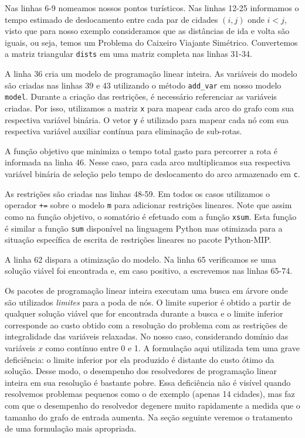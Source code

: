 \documentclass[a4paper,11pt,fleqn]{article}
\begin{document}
Nas linhas 6-9 nomeamos nossos pontos turísticos. 
Nas linhas 12-25 informamos o tempo estimado de deslocamento entre cada par de cidades $(i, j)$ onde $i<j$, visto que para nosso exemplo consideramos que as distâncias de ida e volta são iguais, ou seja, temos um Problema do Caixeiro Viajante Simétrico. 
Convertemos a matriz triangular \texttt{dists} em uma matriz completa nas linhas 31-34.

A linha 36 cria um modelo de programação linear inteira. 
As variáveis do modelo são criadas nas linhas 39 e 43 utilizando o método \texttt{add\_var} em nosso modelo \texttt{model}. 
Durante a criação das restrições, é necessário referenciar as variáveis criadas. 
Por isso, utilizamos a matriz \texttt{x} para mapear cada arco do grafo com sua respectiva variável binária.
O vetor \texttt{y} é utilizado para mapear cada nó com sua respectiva variável auxiliar contínua para eliminação de sub-rotas.

A função objetivo que minimiza o tempo total gasto para percorrer a rota é informada na linha 46. 
Nesse caso, para cada arco multiplicamos sua respectiva variável binária de seleção pelo tempo de deslocamento do arco armazenado em \texttt{c}.

As restrições são criadas nas linhas 48-59. Em todos os casos utilizamos o operador \texttt{+=} sobre o modelo \texttt{m} para adicionar restrições lineares. Note que assim como na função objetivo, o somatório é efetuado com a função \texttt{xsum}. Esta função é similar a função \texttt{sum} disponível na linguagem Python mas otimizada para a situação específica de escrita de restrições lineares no pacote Python-MIP\@. 

A linha 62 dispara a otimização do modelo. Na linha 65 verificamos se uma solução viável foi encontrada e, em caso positivo, a escrevemos nas linhas 65-74.

Os pacotes de programação linear inteira executam uma busca em árvore onde são utilizados \emph{limites} para a poda de nós. 
O limite superior é obtido a partir de qualquer solução viável que for encontrada durante a busca e o limite inferior corresponde ao custo obtido com a resolução do problema com as restrições de integralidade das variáveis relaxadas. 
No nosso caso, considerando domínio das variáveis $x$ como contínuo entre 0 e 1. 
A formulação aqui utilizada tem uma grave deficiência: o limite inferior por ela produzido é distante do custo ótimo da solução. 
Desse modo, o desempenho dos resolvedores de programação linear inteira em sua resolução é bastante pobre. 
Essa deficiência não é visível quando resolvemos problemas pequenos como o de exemplo (apenas 14 cidades), mas faz com que o desempenho do resolvedor degenere muito rapidamente a medida que o tamanho do grafo de entrada aumenta. 
Na seção seguinte veremos o tratamento de uma formulação mais apropriada. 
\end{document}
